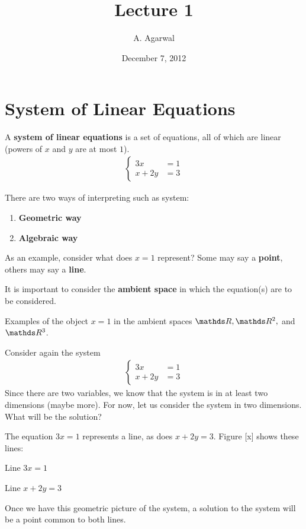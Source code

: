 \documentclass[11pt]{article}
\title{Lecture 1}
\author{A. Agarwal}
\date{December 7, 2012}
\newcommand{\keyphrase}{\textbf}
\begin{document}

\section*{System of Linear Equations}

A \keyphrase{system of linear equations} is a set of equations, all of which are linear (powers of $x$ and $y$ are at most $1$).
\begin{align*}
\left\{\begin{aligned}
3x &= 1
\\
x + 2y &= 3
\end{aligned}
\right.
\end{align*}

There are two ways of interpreting such as system:
\begin{enumerate}
\item{
\textbf{Geometric way}
}
\item{
\textbf{Algebraic way}
}
\end{enumerate}

As an example, consider what does $x=1$ represent? Some may say a \keyphrase{point}, others may say a \keyphrase{line}.

It is important to consider the \keyphrase{ambient space} in which the equation(s) are to be considered.

Examples of the object $x=1$ in the ambient spaces $\bbR, \bbR^2,$ and $\bbR^3$.

Consider again the system
\begin{align}
\left\{\begin{aligned}
3x &= 1
\\
x + 2y &= 3
\end{aligned}
\right.
\label{eq:system1}
\end{align}
Since there are two variables, we know that the system is in at least two dimensions (maybe more). For now, let us consider the system in two dimensions. What will be the solution?

\vspace{.5cm}

The equation $3x=1$ represents a line, as does $x+2y=3$. Figure [x] shows these lines:

Line $3x=1$

Line $x+2y=3$

Once we have this geometric picture of the system, a solution to the system will be a point common to both lines.
\end{document}
